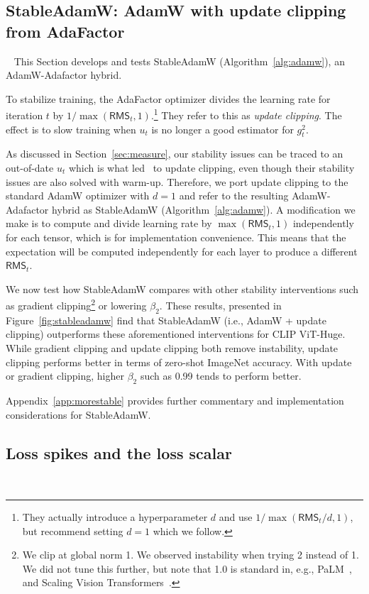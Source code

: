 \subsection{StableAdamW: AdamW with update clipping from AdaFactor}~\label{sec:stableadamw}
This Section develops and tests StableAdamW (Algorithm~\ref{alg:adamw}), an AdamW-Adafactor hybrid.

To stabilize training, the AdaFactor optimizer divides the learning rate for iteration $t$ by $1 / \max(\mathsf{RMS}_t , 1)$.\footnote{They actually introduce a hyperparameter $d$ and use $1 / \max(\mathsf{RMS}_t/d , 1)$, but recommend setting $d=1$ which we follow.} They refer to this as \emph{update clipping}. The effect is to slow training when $u_t$ is no longer a good estimator for $g_t^2$.

As discussed in Section~\ref{sec:measure}, our stability issues can be traced to an out-of-date $u_t$ which is what led~\citet{shazeer2018adafactor} to update clipping, even though their stability issues are also solved with warm-up. Therefore, we port update clipping to the standard AdamW optimizer with $d=1$ and refer to the resulting AdamW-Adafactor hybrid as StableAdamW (Algorithm~\ref{alg:adamw}).
A modification we make is to compute and divide learning rate by $\max(\mathsf{RMS}_t, 1)$ independently for each tensor, which is for implementation convenience. This means that the expectation will be computed independently for each layer to produce a different $\mathsf{RMS}_t$.

We now test how StableAdamW compares with other stability interventions such as gradient clipping\footnote{We clip at global norm 1. We observed instability when trying 2 instead of 1. We did not tune this further, but note that 1.0 is standard in, e.g., PaLM~\cite{chowdhery2022palm}, and Scaling Vision Transformers~\cite{zhai2021scaling}.} or lowering $\beta_2$.
These results, presented in Figure~\ref{fig:stableadamw} find that StableAdamW (i.e., AdamW + update clipping) outperforms these aforementioned interventions for CLIP ViT-Huge. While gradient clipping and update clipping both remove instability, update clipping performs better in terms of zero-shot ImageNet accuracy. With update or gradient clipping, higher $\beta_2$ such as 0.99 tends to perform better.

Appendix~\ref{app:morestable} provides further commentary and implementation considerations for StableAdamW.

\subsection{Loss spikes and the loss scalar}~\label{sec:scaling}

